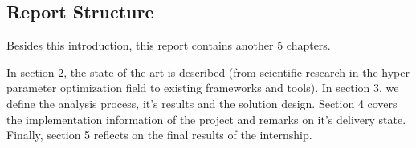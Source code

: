 
\subsection{Report Structure}

Besides this introduction, this report contains another 5 chapters.

In section 2, the state of the art is described (from scientific research in the hyper parameter optimization field to existing frameworks and tools). In section 3, we define the analysis process, it's results and the solution design. Section 4 covers the implementation information of the project and remarks on it's delivery state. Finally, section 5 reflects on the final results of the internship.
